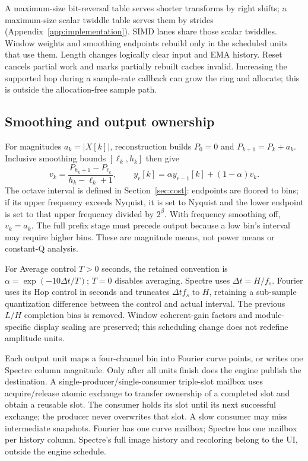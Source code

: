 \documentclass[11pt,letterpaper]{article}
\begin{document}
A maximum-size bit-reversal table serves shorter transforms by right shifts;
a maximum-size scalar twiddle table serves them by strides (Appendix~\ref{app:implementation}). SIMD lanes share
those scalar twiddles. Window weights and smoothing endpoints rebuild only in
the scheduled units that use them. Length changes logically clear input and
EMA history. Reset cancels partial work and marks partially rebuilt caches
invalid. Increasing the supported hop during a sample-rate callback can grow
the ring and allocate; this is outside the allocation-free sample path.

\subsection{Smoothing and output ownership}
For magnitudes $a_k=|X[k]|$, reconstruction builds $P_0=0$ and
$P_{k+1}=P_k+a_k$. Inclusive smoothing bounds $[\ell_k,h_k]$ then give
\begin{equation}
 v_k=\frac{P_{h_k+1}-P_{\ell_k}}{h_k-\ell_k+1},\qquad
 y_r[k]=\alpha y_{r-1}[k]+(1-\alpha)v_k.
\end{equation}
The octave interval is defined in Section~\ref{sec:cost}: endpoints are floored
to bins; if its upper frequency exceeds Nyquist, it is set to Nyquist and the
lower endpoint is set to that upper frequency divided by $2^\beta$. With
frequency smoothing off, $v_k=a_k$. The full prefix stage must precede output
because a low bin's interval may require higher bins. These are magnitude
means, not power means or constant-Q analysis.

For Average control $T>0$ seconds, the retained convention is
$\alpha=\exp(-10\Delta t/T)$; $T=0$ disables averaging. Spectre uses
$\Delta t=H/f_s$. Fourier uses its Hop control in seconds and truncates
$\Delta t f_s$ to $H$, retaining a sub-sample quantization difference between
the control and actual interval. The previous $L/H$ completion bias is removed.
Window coherent-gain factors and module-specific display scaling are preserved;
this scheduling change does not redefine amplitude units.

Each output unit maps a four-channel bin into Fourier curve points, or writes
one Spectre column magnitude. Only after all units finish does the engine
publish the destination. A single-producer/single-consumer triple-slot mailbox
uses acquire/release atomic exchange to transfer ownership of a completed
slot and obtain a reusable slot. The consumer holds its slot until its next
successful exchange; the producer never overwrites that slot. A slow consumer
may miss intermediate snapshots. Fourier has one curve mailbox; Spectre has
one mailbox per history column. Spectre's full image history and recoloring
belong to the UI, outside the engine schedule.
\end{document}
